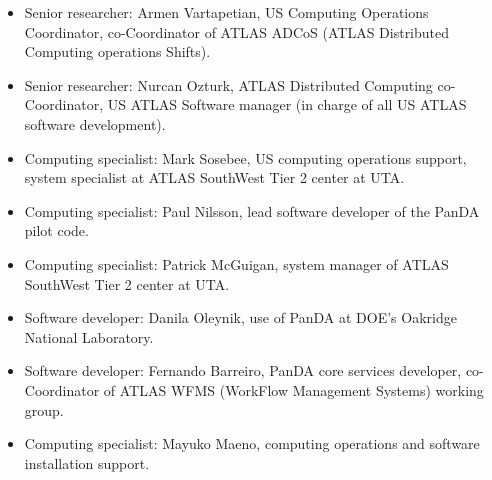 \begin{itemize}[noitemsep,nolistsep]
    \item Senior researcher: Armen Vartapetian, US Computing Operations Coordinator, co-Coordinator of ATLAS ADCoS (ATLAS Distributed Computing operations Shifts).
    \item Senior researcher: Nurcan Ozturk, ATLAS Distributed Computing co-Coordinator, US ATLAS Software manager (in charge of all US ATLAS software development).
    \item Computing specialist: Mark Sosebee, US computing operations support, system specialist at ATLAS SouthWest Tier 2 center at UTA.
    \item Computing specialist: Paul Nilsson, lead software developer of the PanDA pilot code.
    \item Computing specialist: Patrick McGuigan, system manager of ATLAS SouthWest Tier 2 center at UTA.
    \item Software developer: Danila Oleynik, use of PanDA at DOE's Oakridge National Laboratory.
    \item Software developer: Fernando Barreiro, PanDA core services developer, co-Coordinator of ATLAS WFMS (WorkFlow Management Systems) working group.
    \item Computing specialist: Mayuko Maeno, computing operations and software installation support.
\end{itemize}
